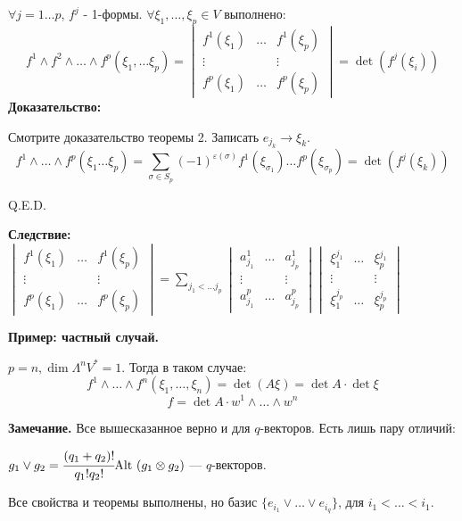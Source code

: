 $\forall j = 1\ldots p$, $f^j$ - 1-формы. $\forall \xi_1,\ldots,\xi_p \in V$ выполнено:
$$f^1\wedge f^2 \wedge \ldots \wedge f^p(\xi_1,\ldots \xi_p) = \begin{vmatrix}
    f^1(\xi_1) & \ldots & f^1(\xi_p)\\
    \vdots & &\vdots \\
    f^p(\xi_1) &\ldots & f^p(\xi_p) 
\end{vmatrix} = \det (f^j(\xi_i))$$
\textbf{Доказательство:}

Смотрите доказательство теоремы 2. Записать $e_{j_k}\rightarrow \xi_k$.
$$f^1 \wedge \ldots \wedge f^p(\xi_1\ldots \xi_p) = \sum\limits_{\sigma \in S_p}(-1)^{\varepsilon(\sigma)} f^1(\xi_{\sigma_1})\ldots f^p(\xi_{\sigma_p}) = \det(f^{j}(\xi_k)) $$

\hfill Q.E.D.

\textbf{Следствие:} $\begin{vmatrix}
f^1(\xi_1) & \ldots & f^1(\xi_p)\\
\vdots & & \vdots \\
f^p(\xi_1) & \ldots & f^p(\xi_p)
\end{vmatrix} = \sum\limits_{j_1 < \ldots j_p} \begin{vmatrix}
    a_{j_1}^1 & \ldots & a^1_{j_p}\\
    \vdots & & \vdots \\
    a_{j_1}^p & \ldots & a_{j_{p}}^p 
\end{vmatrix} \begin{vmatrix}
    \xi^{j_1}_{1} & \ldots & \xi_{p}^{j_1} \\
    \vdots & & \vdots \\
    \xi_{1}^{j_p} & \ldots & \xi_{p}^{j_p}
\end{vmatrix}$ 


\textbf{Пример: частный случай.}

$p=n, \dim \Lambda^n V^* =1 $. Тогда в таком случае:
$$f^1 \wedge \ldots \wedge f^n (\xi_1,\ldots , \xi_n) = \det(A\xi) = \det A \cdot \det \xi$$
$$f = \det A \cdot w^1\wedge \ldots \wedge w^n$$

\textbf{Замечание.} Все вышесказанное верно  и для $q$-векторов. Есть лишь пару отличий:

$g_1 \vee g_2 = \cfrac{(q_1+q_2)!}{q_1!q_2!} \text{Alt }(g_1 \otimes g_2)$ ---  $q$-векторов.

Все свойства и теоремы выполнены, но базис $\{e_{i_1}\vee \ldots \vee e_{i_q} \}$, для $i_1 < \ldots < i_1$.

